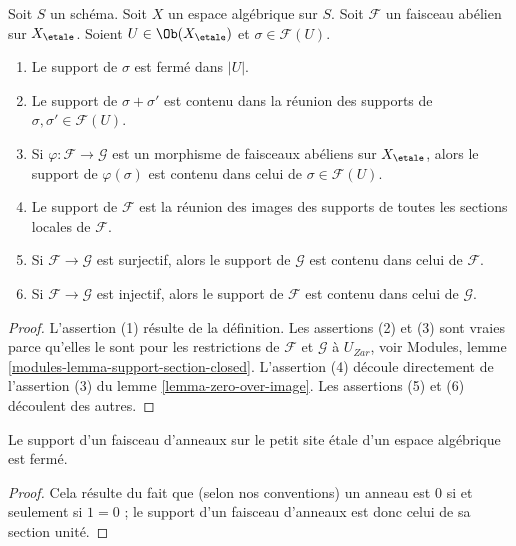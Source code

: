 \begin{lemma}
\label{lemma-support-section-closed}
Soit $S$ un schéma.
Soit $X$ un espace algébrique sur $S$.
Soit $\mathcal{F}$ un faisceau abélien sur $X_\etale$.
Soient $U \in \Ob(X_\etale)$ et $\sigma \in \mathcal{F}(U)$.
\begin{enumerate}
\item Le support de $\sigma$ est fermé dans $|U|$.
\item Le support de $\sigma + \sigma'$ est contenu dans la réunion des
supports de $\sigma, \sigma' \in \mathcal{F}(U)$.
\item Si $\varphi : \mathcal{F} \to \mathcal{G}$ est un morphisme de
faisceaux abéliens sur $X_\etale$, alors le support de $\varphi(\sigma)$ est
contenu dans celui de $\sigma \in \mathcal{F}(U)$.
\item Le support de $\mathcal{F}$ est la réunion des images des
supports de toutes les sections locales de $\mathcal{F}$.
\item Si $\mathcal{F} \to \mathcal{G}$ est surjectif, alors le support
de $\mathcal{G}$ est contenu dans celui de $\mathcal{F}$.
\item Si $\mathcal{F} \to \mathcal{G}$ est injectif, alors le support
de $\mathcal{F}$ est contenu dans celui de $\mathcal{G}$.
\end{enumerate}
\end{lemma}

\begin{proof}
L'assertion (1) résulte de la définition.
Les assertions (2) et (3) sont vraies parce qu'elles le sont pour les
restrictions de $\mathcal{F}$ et $\mathcal{G}$ à $U_{Zar}$, voir
Modules, lemme \ref{modules-lemma-support-section-closed}.
L'assertion (4) découle directement de l'assertion (3) du
lemme \ref{lemma-zero-over-image}.
Les assertions (5) et (6) découlent des autres.
\end{proof}

\begin{lemma}
\label{lemma-support-sheaf-rings-closed}
Le support d'un faisceau d'anneaux sur le petit site \'etale d'un
espace algébrique est fermé.
\end{lemma}

\begin{proof}
Cela résulte du fait que (selon nos conventions)
un anneau est $0$ si et seulement si
$1 = 0$ ; le support d'un faisceau d'anneaux
est donc celui de sa section unité.
\end{proof}






